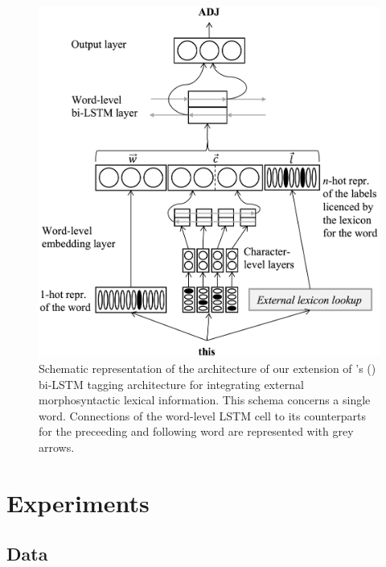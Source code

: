 \documentclass[11pt,letterpaper]{article}
\begin{document}
\begin{figure}
\includegraphics[width=\columnwidth]{emnlp17schemaB}
\caption{Schematic representation of the architecture of our extension of \citeauthor{plank16}'s (\citeyear{plank16})
  bi-LSTM tagging architecture for integrating external morphosyntactic lexical information. This schema concerns a
  single word. Connections of the word-level LSTM cell to its counterparts for the preceeding and following word are
  represented with grey arrows.}\label{fig:schema}
\end{figure}

\section{Experiments}

\subsection{Data}
\end{document}
